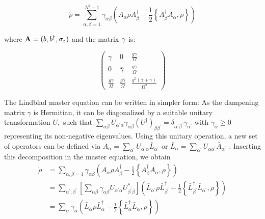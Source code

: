 \documentclass[reprint,aps,onecolumn,pra,notitlepage,nofootinbib]{revtex4-1}
\theoremstyle{definition}
\numberwithin{equation}{section}
\begin{document}
\begin{equation}
\dot{\rho}=\sum_{\alpha, \beta=1}^{N^{2}-1} \gamma_{\alpha \beta}\left(A_{\alpha} \rho A_{\beta}^{\dagger}-\frac{1}{2}\left\{A_{\beta}^{\dagger} A_{\alpha}, \rho\right\}\right)
\end{equation}
 
where $\bold{A} =(b,b^{\dagger}, \sigma_z) $ and the matrix $\bold{\gamma}$ is: 

\begin{equation}
\left(\begin{array}{ccc}
\gamma & 0 & \frac{g \gamma}{\Omega} \\
0 & \bar{\gamma} & \frac{g \bar{\gamma}}{\Omega} \\
\frac{g \gamma}{\Omega} & \frac{g \bar{\gamma}}{\Omega} & \frac{g^{2}(\bar{\gamma}+\gamma)}{\Omega^{2}}
\end{array}\right)
\end{equation}
 
 
 
The Lindblad master equation can be written in simpler form: As the dampening matrix $\gamma$ is Hermitian, it can be diagonalized by a suitable unitary transformation $U,$ such that $\sum_{\alpha \beta} U_{\alpha^{\prime} \alpha} \gamma_{\alpha \beta}\left(U^{\dagger}\right)_{\beta \beta^{\prime}}=\delta_{\alpha^{\prime} \beta^{\prime}} \gamma_{\alpha^{\prime}}$ with $\gamma_{\alpha} \geq 0$ representing its non-negative eigenvalues. Using this
unitary operation, a new set of operators can be defined via $A_{\alpha}=\sum_{\alpha^{\prime}} U_{\alpha^{\prime} \alpha} \bar{L}_{\alpha^{\prime}}$ or $\bar{L}_{\alpha}=\sum_{\alpha^{\prime}} U_{ \alpha \alpha^{\prime} } \bar{A}_{\alpha^{\prime}}$ . Inserting this decomposition in the master equation, we obtain
$$
\begin{aligned}
\dot{\rho} &=\sum_{\alpha, \beta=1} \gamma_{\alpha \beta}\left(A_{\alpha} \rho A_{\beta}^{\dagger}-\frac{1}{2}\left\{A_{\beta}^{\dagger} A_{\alpha}, \rho\right\}\right) \\
&=\sum_{\alpha^{\prime}, \beta^{\prime}}\left[\sum_{\alpha \beta} \gamma_{\alpha \beta} U_{\alpha^{\prime} \alpha} U_{\beta^{\prime} \beta}^{*}\right]\left(\bar{L}_{\alpha^{\prime}} \rho \bar{L}_{\beta^{\prime}}^{\dagger}-\frac{1}{2}\left\{\bar{L}_{\beta^{\prime}}^{\dagger} \bar{L}_{\alpha^{\prime}}, \rho\right\}\right) \\
&=\sum_{\alpha} \gamma_{\alpha}\left(\bar{L}_{\alpha} \rho \bar{L}_{\alpha}^{\dagger}-\frac{1}{2}\left\{\bar{L}_{\alpha}^{\dagger} \bar{L}_{\alpha}, \rho\right\}\right)
\end{aligned}
$$
 
\end{document}
